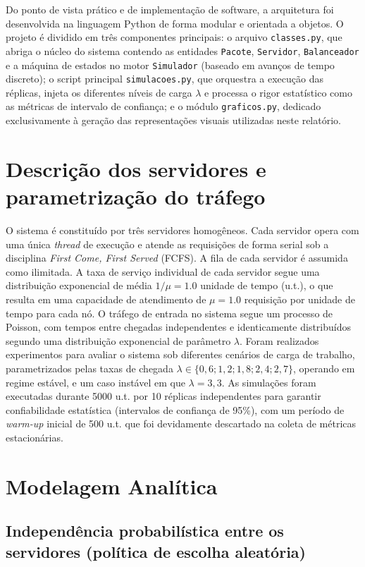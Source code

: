 \documentclass[conference]{IEEE_Conference_Template/IEEEtran}
\begin{document}
Do ponto de vista prático e de implementação de software, a arquitetura foi desenvolvida na linguagem Python de forma modular e orientada a objetos. O projeto é dividido em três componentes principais: o arquivo \texttt{classes.py}, que abriga o núcleo do sistema contendo as entidades \texttt{Pacote}, \texttt{Servidor}, \texttt{Balanceador} e a máquina de estados no motor \texttt{Simulador} (baseado em avanços de tempo discreto); o script principal \texttt{simulacoes.py}, que orquestra a execução das réplicas, injeta os diferentes níveis de carga $\lambda$ e processa o rigor estatístico como as métricas de intervalo de confiança; e o módulo \texttt{graficos.py}, dedicado exclusivamente à geração das representações visuais utilizadas neste relatório.

\section{Descrição dos servidores e parametrização do tráfego}
O sistema é constituído por três servidores homogêneos. Cada servidor opera com uma única \textit{thread} de execução e atende as requisições de forma serial sob a disciplina \textit{First Come, First Served} (FCFS). A fila de cada servidor é assumida como ilimitada. A taxa de serviço individual de cada servidor segue uma distribuição exponencial de média $1/\mu = 1.0$ unidade de tempo (u.t.), o que resulta em uma capacidade de atendimento de $\mu = 1.0$ requisição por unidade de tempo para cada nó. 
O tráfego de entrada no sistema segue um processo de Poisson, com tempos entre chegadas independentes e identicamente distribuídos segundo uma distribuição exponencial de parâmetro $\lambda$. Foram realizados experimentos para avaliar o sistema sob diferentes cenários de carga de trabalho, parametrizados pelas taxas de chegada $\lambda \in \{0,6; 1,2; 1,8; 2,4; 2,7\}$, operando em regime estável, e um caso instável em que $\lambda = 3,3$. As simulações foram executadas durante 5000 u.t. por 10 réplicas independentes para garantir confiabilidade estatística (intervalos de confiança de 95\%), com um período de \textit{warm-up} inicial de 500 u.t. que foi devidamente descartado na coleta de métricas estacionárias.

\section{Modelagem Analítica}

\subsection{Independência probabilística entre os servidores (política de escolha aleatória)}
\end{document}
